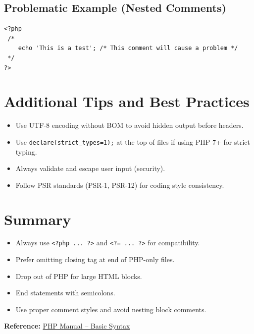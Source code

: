 \documentclass[12pt,a4paper]{article}
\begin{document}
\subsection*{Problematic Example (Nested Comments)}
\begin{verbatim}
<?php
 /*
    echo 'This is a test'; /* This comment will cause a problem */
 */
?>
\end{verbatim}

\section{Additional Tips and Best Practices}
\begin{itemize}[left=1em]
  \item Use UTF-8 encoding without BOM to avoid hidden output before headers.
  \item Use \texttt{declare(strict\_types=1);} at the top of files if using PHP 7+ for strict typing.
  \item Always validate and escape user input (security).
  \item Follow PSR standards (PSR-1, PSR-12) for coding style consistency.
\end{itemize}

\section*{Summary}
\begin{itemize}[left=1em]
  \item Always use \verb|<?php ... ?>| and \verb|<?= ... ?>| for compatibility.
  \item Prefer omitting closing tag at end of PHP-only files.
  \item Drop out of PHP for large HTML blocks.
  \item End statements with semicolons.
  \item Use proper comment styles and avoid nesting block comments.
\end{itemize}

\bigskip
\noindent\textbf{Reference:} \href{https://www.php.net/manual/en/language.basic-syntax.php}{PHP Manual – Basic Syntax}
\end{document}
